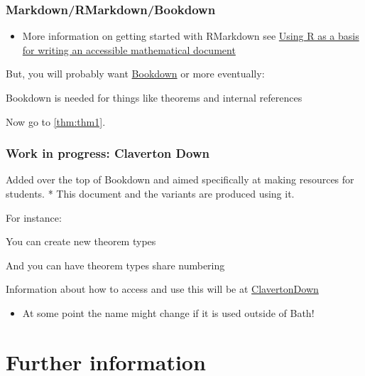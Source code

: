 \documentclass[
  17pt,
  english,
  a4paper]{extarticle}
\providecommand{\tightlist}{%
  \setlength{\itemsep}{0pt}\setlength{\parskip}{0pt}}
\theoremstyle{plain}
\theoremstyle{plain}
\theoremstyle{plain}
\theoremstyle{plain}
\theoremstyle{plain}
\theoremstyle{definition}
\theoremstyle{definition}
\theoremstyle{definition}
\theoremstyle{remark}
\let\BeginKnitrBlock\begin \let\EndKnitrBlock\end
\renewcommand{\;}{\,}
\begin{document}
\hypertarget{markdownrmarkdownbookdown}{%
\subsubsection{Markdown/RMarkdown/Bookdown}\label{markdownrmarkdownbookdown}}

\begin{itemize}
\tightlist
\item
  More information on getting started with RMarkdown see \href{https://stem-enable.github.io/RMarkdownWorkshop/}{Using R as a basis for writing an accessible mathematical document}
\end{itemize}

But, you will probably want \href{https://bookdown.org/}{Bookdown} or more eventually:

\BeginKnitrBlock{theorem}
\label{thm:thm1} Bookdown is needed for things like theorems and internal references
\EndKnitrBlock{theorem}

Now go to \ref{thm:thm1}.

\hypertarget{work-in-progress-claverton-down}{%
\subsubsection{Work in progress: Claverton Down}\label{work-in-progress-claverton-down}}

Added over the top of Bookdown and aimed specifically at making resources for students.
* This document and the variants are produced using it.

For instance:

\BeginKnitrBlock{Thought}
\protect\hypertarget{Thought:tho1}{}{ \label{tho:tho1} }You can create new theorem types
\EndKnitrBlock{Thought}

\BeginKnitrBlock{Nugget}
\protect\hypertarget{Nugget:nug1}{}{ \label{nug:nug1} }And you can have theorem types share numbering
\EndKnitrBlock{Nugget}

Information about how to access and use this will be at \href{https://github.com/BathMASH/clavertondown\#readme}{ClavertonDown}

\begin{itemize}
\tightlist
\item
  At some point the name might change if it is used outside of Bath!
\end{itemize}

\hypertarget{further-information}{%
\section{Further information}\label{further-information}}
\end{document}
